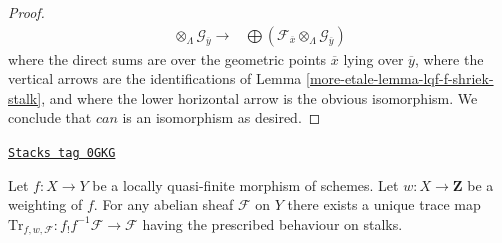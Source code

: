 \begin{proof}
$$\begin{array}{cc}
\otimes_\Lambda \mathcal{G}_{\overline{y}} \longrightarrow & \bigoplus
(\mathcal{F}_{\overline{x}} \otimes_\Lambda \mathcal{G}_{\overline{y}})\end{array}
$$
where the direct sums are over the geometric points $\overline{x}$
lying over $\overline{y}$, where the vertical arrows are the identifications
of Lemma \ref{more-etale-lemma-lqf-f-shriek-stalk}, and where the lower horizontal arrow
is the obvious isomorphism.
We conclude that $can$ is an isomorphism as desired.
\end{proof}

\begin{lemma}
\label{more-etale-lemma-trace-map-exists}
\href{https://stacks.math.columbia.edu/tag/0GKG}{\texttt{Stacks tag 0GKG}}

Let $f : X \to Y$ be a locally quasi-finite morphism of schemes.
Let $w : X \to \mathbf{Z}$ be a weighting of $f$. For any abelian sheaf
$\mathcal{F}$ on $Y$ there exists a unique trace map
$\text{Tr}_{f, w, \mathcal{F}} : f_!f^{-1}\mathcal{F} \to \mathcal{F}$
having the prescribed behaviour on stalks.
\end{lemma}


